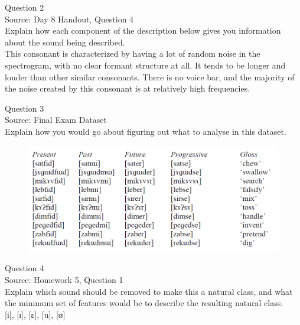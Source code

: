 \documentclass[12pt]{article}
\begin{document}
\newpage

{\large Question 2}\\

Source: Day 8 Handout, Question 4\\

Explain how each component of the description below gives you information about the sound being described.\\

This consonant is characterized by having a lot of random noise in the spectrogram, with no clear formant structure at all. It tends to be longer and louder than other similar consonants. There is no voice bar, and the majority of the noise created by this consonant is at relatively high frequencies.


\newpage

{\large Question 3}\\

Source: Final Exam Dataset\\

Explain how you would go about figuring out what to analyse in this dataset.\\

\begin{figure}[H]
\includegraphics{../images/final_dataset.png}
\end{figure}

\newpage

{\large Question 4}\\

Source: Homework 5, Question 1\\

Explain which sound should be removed to make this a natural class, and what the minimum set of features would be to describe the resulting natural class.\\

{[i]}, {[ɪ]}, {[ɛ]}, {[u]}, {[ʊ]}


\newpage
\end{document}
